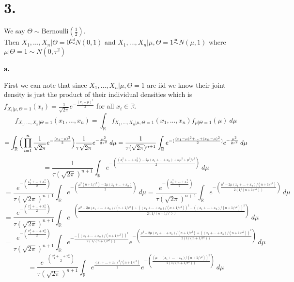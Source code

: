 \documentclass{article}
\begin{document}
\newpage
\section*{3.}
\begin{center}
\doublespacing
    We say $\Theta\sim\mbox{Bernoulli}(\frac{1}{2})$.
    \\Then $X_1, ..., X_n |\Theta = 0\overset{\mbox{iid}}{\sim} N(0, 1)$ and $X_1, ..., X_n |\mu, \Theta = 1\overset{\mbox{iid}}{\sim} N(\mu, 1)$ where $\mu |\Theta = 1\sim N(0,\tau^2)$
\end{center}

{\Large\textbf{a.}}
\begin{center}
\doublespacing
    First we can note that since $X_1, ..., X_n |\mu, \Theta = 1$ are iid we know their joint density is just the product of their individual densities which is $f_{X_i |\mu,\Theta = 1} (x_i) =\frac{1}{\sqrt{2\pi}} e^{-\frac{(x_i -\mu)^2}{2}}$ for all $x_i\in\mathbb{R}$.
    \[f_{X_1, ..., X_n |\Theta = 1} (x_1, ..., x_n) =\int_{\mathbb{R}} f_{X_1, ..., X_n |\mu,\Theta = 1} (x_1, ..., x_n) f_{\mu |\Theta = 1} (\mu)\:d\mu\]
    \[=\int_{\mathbb{R}}\Big{(}\prod_{i=1}^n\frac{1}{\sqrt{2\pi}} e^{-\frac{(x_i -\mu)^2}{2}}\Big{)}\frac{1}{\tau\sqrt{2\pi}} e^{-\frac{\mu^2}{2\tau^2}} \:d\mu =\frac{1}{\tau(\sqrt{2\pi})^{n+1}}\int_{\mathbb{R}} e^{-(\frac{(x_1 -\mu)^2 + ... + (x_n -\mu)^2}{2})} e^{-\frac{\mu^2}{2\tau^2}} \:d\mu\]
    \[=\frac{1}{\tau(\sqrt{2\pi})^{n+1}}\int_{\mathbb{R}} e^{-(\frac{(x_1^2 + ... + x_n^2) - 2\mu (x_1 + ... + x_n) + n\mu^2 +\mu^2 /\tau^2}{2})} \:d\mu\]
    \[=\frac{e^{-(\frac{x_1^2 + ... + x_n^2}{2})}}{\tau(\sqrt{2\pi})^{n+1}}\int_{\mathbb{R}} e^{-(\frac{\mu^2 (n + 1/\tau^2) - 2\mu (x_1 + ... + x_n)}{2})} \:d\mu =\frac{e^{-(\frac{x_1^2 + ... + x_n^2}{2})}}{\tau(\sqrt{2\pi})^{n+1}}\int_{\mathbb{R}} e^{-(\frac{\mu^2 - 2\mu (x_1 + ... + x_n)/(n + 1/\tau^2)}{2(1/(n + 1/\tau^2))})} \:d\mu\]
    \[=\frac{e^{-(\frac{x_1^2 + ... + x_n^2}{2})}}{\tau(\sqrt{2\pi})^{n+1}}\int_{\mathbb{R}} e^{-(\frac{\mu^2 - 2\mu (x_1 + ... + x_n)/(n + 1/\tau^2) + ((x_1 + ... + x_n)/(n + 1/\tau^2))^2 - ((x_1 + ... + x_n)/(n + 1/\tau^2))^2}{2(1/(n + 1/\tau^2))})} \:d\mu\]
    \[=\frac{e^{-(\frac{x_1^2 + ... + x_n^2}{2})}}{\tau(\sqrt{2\pi})^{n+1}}\int_{\mathbb{R}} e^{-\frac{-((x_1 + ... + x_n)/(n + 1/\tau^2))^2}{2(1/(n+1/\tau^2))}}e^{-(\frac{\mu^2 - 2\mu (x_1 + ... + x_n)/(n + 1/\tau^2) + ((x_1 + ... + x_n)/(n + 1/\tau^2))^2}{2(1/(n + 1/\tau^2))})} \:d\mu\]
    \[=\frac{e^{-(\frac{x_1^2 + ... + x_n^2}{2})}}{\tau(\sqrt{2\pi})^{n+1}}\int_{\mathbb{R}} e^{\frac{(x_1 + ... + x_n)^2/(n + 1/\tau^2)}{2}}e^{-(\frac{(\mu - (x_1 + ... + x_n)/(n + 1/\tau^2))^2}{2(1/(n + 1/\tau^2))})} \:d\mu\]

\end{center}
\end{document}
